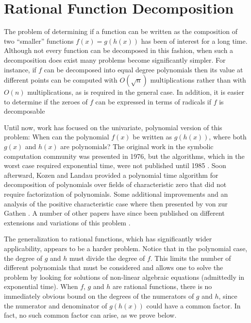 \chapter{Rational Function Decomposition}
\label{RatDecomp:Chap}

The problem of determining if a function can be written as the
composition of two ``smaller'' functions $f(x) = g(h(x))$ has been of
interest for a long time.  Although not every function can be
decomposed in this fashion, when such a decomposition does exist many
problems become significantly simpler.  For instance, if $f$ can be
decomposed into equal degree polynomials then its value at different
points can be computed with $O(\sqrt{n})$ multiplications rather than
with $O(n)$ multiplications, as is required in the general case.  In
addition, it is easier to determine if the zeroes of $f$ can be
expressed in terms of radicals if $f$ is decomposable

Until now, work has focused on the univariate, polynomial version of
this problem: When can the polynomial $f(x)$ be written as $g(h(x))$,
where both $g(x)$ and $h(x)$ are polynomials?  The original work in
the symbolic computation community was presented in 1976, 
but the algorithms, which in the worst case
required exponential time, were not published until 1985
\cite{Barton1985-hz}.  Soon afterward, Kozen and Landau
\cite{Kozen1989-ns} provided a polynomial time algorithm for
decomposition of polynomials over fields of characteristic zero that
did not require factorization of polynomials.  Some additional
improvements and an analysis of the positive characteristic case where
then presented by von zur Gathen \cite{Von_zur_Gathen1987-xe,Von_zur_Gathen1990-wd,Von_zur_Gathen1990-vk}. A number
of other papers have since been published on different extensions and
variations of this problem
\cite{Alagar1985-hf,Gutierrez1989-ou,Dickerson1989-cy,Dickerson1989-ve}. 

The generalization to rational functions, which has significantly
wider applicability, appears to be a harder problem.  Notice that in
the polynomial case, the degree of $g$ and $h$ must divide the degree
of $f$.  This limits the number of different polynomials that must be
considered and allows one to solve the problem by looking for
solutions of non-linear algebraic equations (admittedly in exponential
time).  When $f$, $g$ and $h$ are rational functions, there is no
immediately obvious bound on the degrees of the numerators of $g$ and
$h$, since the numerator and denominator of $g(h(x))$ could have a
common factor.  In fact, no such common factor can arise, as we prove
below.

